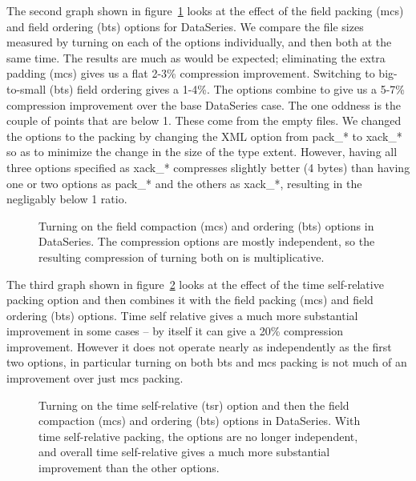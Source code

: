 The second graph shown in figure~\ref{fig:wc1998:ds-opts-1} looks
at the effect of the field packing (mcs) and field ordering (bts)
options for DataSeries.  We compare the file sizes measured by turning
on each of the options individually, and then both at the same time.
The results are much as would be expected; eliminating the extra
padding (mcs) gives us a flat 2-3\% compression improvement.
Switching to big-to-small (bts) field ordering gives a 1-4\%.  The
options combine to give us a 5-7\% compression improvement over the
base DataSeries case.  The one oddness is the couple of points that
are below 1.  These come from the empty files.  We changed the options
to the packing by changing the XML option from pack\_* to xack\_* so
as to minimize the change in the size of the type extent.  However,
having all three options specified as xack\_* compresses slightly
better (4 bytes) than having one or two options as pack\_* and the
others as xack\_*, resulting in the negligably below 1 ratio.

\begin{figure}
\caption{Turning on the field compaction (mcs) and ordering (bts) options 
in DataSeries.  The compression options are mostly independent, so the
resulting compression of turning both on is multiplicative.}
\label{fig:wc1998:ds-opts-1}
\end{figure}

The third graph shown in figure~\ref{fig:wc1998:ds-opts-2} looks
at the effect of the time self-relative packing option and then
combines it with the field packing (mcs) and field ordering (bts)
options.  Time self relative gives a much more substantial improvement
in some cases -- by itself it can give a 20\% compression improvement.
However it does not operate nearly as independently as the first two
options, in particular turning on both bts and mcs packing is not much
of an improvement over just mcs packing.

\begin{figure}
\caption{Turning on the time self-relative (tsr) option and then the 
field compaction (mcs) and ordering (bts) options in DataSeries.  
With time self-relative packing, the options are no longer independent, 
and overall time self-relative gives a much more substantial improvement 
than the other options.}
\label{fig:wc1998:ds-opts-2}
\end{figure}

